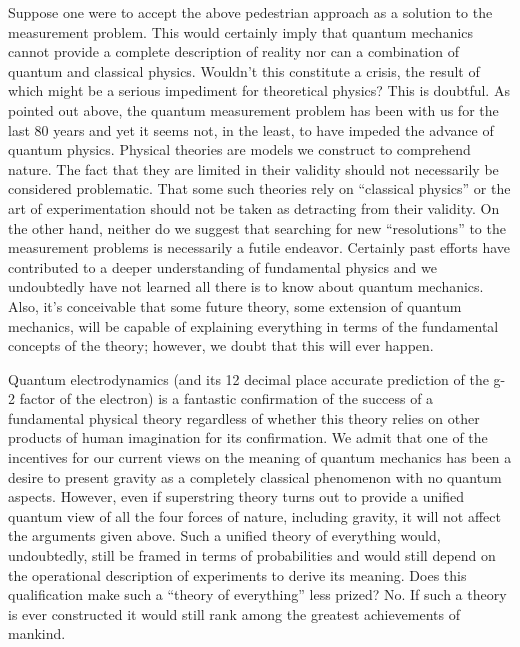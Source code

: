 \documentclass [12pt]{revtex4}
\begin{document}
Suppose one were to accept the above pedestrian
approach as a solution to the measurement problem. This would
certainly imply that quantum mechanics cannot provide a complete
description of reality nor can a combination of quantum and
classical physics. Wouldn't this constitute a crisis, the result of
which might be a serious impediment for theoretical physics? This is
doubtful. As pointed out above, the quantum measurement problem has
been with us for the last 80 years and yet it seems not, in the
least, to have impeded the advance of quantum physics. Physical
theories are models we construct to comprehend nature. The fact that
they are limited in their validity should not necessarily be
considered problematic. That some such theories rely on ``classical
physics'' or the art of experimentation should not be taken as
detracting from their validity.  On the other hand, neither do we
suggest that searching for new ``resolutions'' to the measurement problems
is necessarily a futile endeavor.
Certainly past efforts have contributed to a deeper understanding of
fundamental physics and we undoubtedly have not learned all there is
to know about quantum mechanics.  Also, it's conceivable that some future
theory, some extension of quantum mechanics, will be capable of explaining
everything in terms of the fundamental concepts of the theory; however,
we doubt that this will ever happen.

Quantum electrodynamics (and its 12 decimal place accurate
prediction of the g-2 factor of the electron) is a fantastic
confirmation of the success of a fundamental physical theory
regardless of whether this theory relies on other products of human
imagination for its confirmation. We admit that one of the
incentives for our current views on the meaning of quantum mechanics
has been a desire to present gravity as a completely classical
phenomenon with no quantum aspects. However, even if superstring
theory turns out to provide a unified quantum view of all the four
forces of nature, including gravity, it will not affect the
arguments given above. Such a unified theory of everything would,
undoubtedly, still be framed in terms of probabilities and would
still depend on the operational description of experiments to derive
its meaning. Does this qualification make such a ``theory of
everything'' less prized? No. If such a theory is ever constructed
it would still rank among the greatest achievements of mankind.
\end{document}
